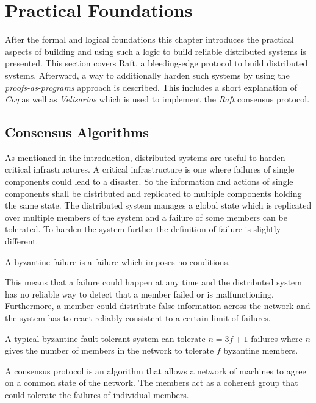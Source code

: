 %
\section{Practical Foundations}
\label{sec_3}

After the formal and logical foundations this chapter introduces
the practical aspects of building and using such a logic to build
reliable distributed systems is presented. This section covers Raft,
a bleeding-edge protocol to build distributed systems.
Afterward, a way to additionally harden such systems by using
the \textit{proofs-as-programs} approach is described.
This includes a short explanation of \textit{Coq} as well as
\textit{Velisarios} which is used to implement the \textit{Raft}
consensus protocol.

\subsection{Consensus Algorithms}
As mentioned in the introduction, distributed systems are useful to harden
critical infrastructures. A critical infrastructure is one where failures
of single components could lead to a disaster. So the information and
actions of single components shall be distributed and replicated to multiple
components holding the same state. The distributed system manages a
global state which is replicated over multiple members of the system and
a failure of some members can be tolerated. To harden the system further
the definition of failure is slightly different.~\cite{rahli2018velisarios}

\begin{defi}
  A byzantine failure is a failure which imposes no conditions.
\end{defi}

This means that a failure could happen at any time and the distributed
system has no reliable way to detect that a member failed or is malfunctioning.
Furthermore, a member could distribute false information across the network
and the system has to react reliably consistent to a certain limit of failures.~\cite{lamport1982byzantine}

\begin{defi}
  A typical byzantine fault-tolerant system can tolerate $n=3f+1$ failures
  where $n$ gives the number of members in the network to tolerate $f$ byzantine
  members.
\end{defi}

\begin{defi}
  A consensus protocol is an algorithm that allows a network of machines to
  agree on a common state of the network. The members act as a coherent
  group that could tolerate the failures of individual members.
\end{defi}

